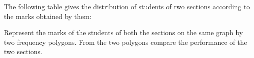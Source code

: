  The following table gives the distribution
of students of two sections according to the
marks obtained by them:
\begin{table}[!ht]
\centering

\label{table:Q42}	
\end{table}
Represent the marks of the students of both the sections on the same graph by two frequency polygons. From the two polygons compare the performance of the two sections.
